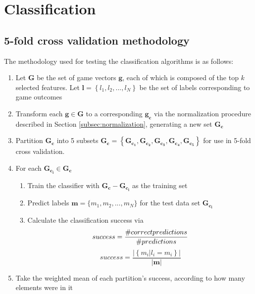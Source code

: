 \documentclass[]{article}
\begin{document}
\section{Classification}
\subsection{5-fold cross validation methodology}
\label{subsec:five_fold}

The methodology used for testing the classification algorithms is as follows:

\begin{enumerate}
	\item Let $\mathbf{G}$ be the set of game vectors $\mathbf{g}$, each of which is composed of the top $k$ selected features. Let $\mathbf{l} = \left\{l_1, l_2, ..., l_N\right\}$ be the set of labels corresponding to game outcomes
	\item Transform each $\mathbf{g} \in \mathbf{G}$ to a corresponding $\mathbf{g_c}$ via the normalization procedure described in Section \ref{subsec:normalization}, generating a new set $\mathbf{G_c}$
	\item Partition ${\mathbf{G_c}}$ into 5 subsets $\mathbf{G_c} = \left\{ \mathbf{G_{c_1}}, \mathbf{G_{c_2}}, \mathbf{G_{c_3}}, \mathbf{G_{c_4}}, \mathbf{G_{c_5}}\right\}$ for use in 5-fold cross validation.
	\item For each $\mathbf{G_{c_i}} \in \mathbf{G_c}$
	\begin{enumerate}
		\item Train the classifier with $\mathbf{G_{c}} - \mathbf{G_{c_i}}$ as the training set
		\item Predict labels $\mathbf{m} = \{m_1, m_2, ..., m_N\}$ for the test data set $\mathbf{G_{c_i}}$
		\item Calculate the classification success via
			\begin{equation}
				success = \frac{\# correct predictions}{\# predictions}\\
			\end{equation}
			\begin{equation}
				success = \frac{\left\vert\left\{m_i | l_i = m_i \right\}\right\vert}{\left\vert\textbf{m}\right\vert}
			\end{equation}
	\end{enumerate}
	\item Take the weighted mean of each partition's success, according to how many elements were in it
\end{enumerate}
\end{document}
